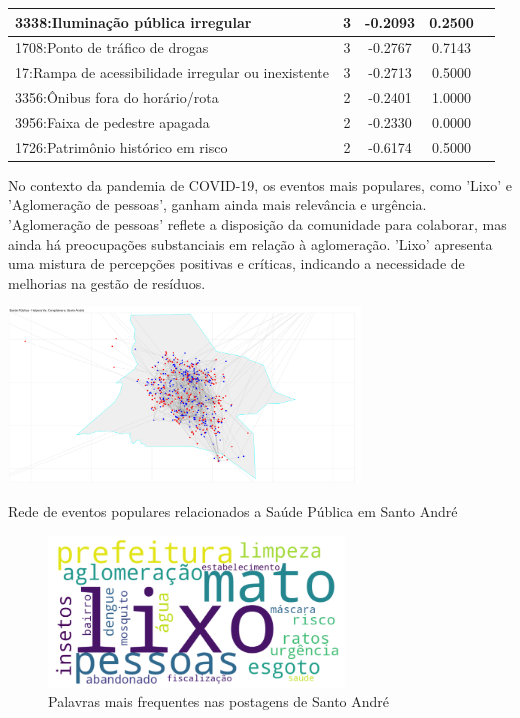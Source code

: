 \begin{table}[htbp]
\begin{tabular}{|l|c|c|c|c|}
		\hline
		3338:Iluminação pública irregular                     & 3                & -0.2093        & 0.2500           \\
		\hline
		1708:Ponto de tráfico de drogas                       & 3                & -0.2767        & 0.7143           \\
		\hline
		17:Rampa de acessibilidade irregular ou inexistente   & 3                & -0.2713        & 0.5000           \\
		\hline
		3356:Ônibus fora do horário/rota                      & 2                & -0.2401        & 1.0000           \\
		\hline
		3956:Faixa de pedestre apagada                        & 2                & -0.2330        & 0.0000           \\
		\hline
		1726:Patrimônio histórico em risco                    & 2                & -0.6174        & 0.5000           \\
		\hline
	\end{tabular}
\end{table}

No contexto da pandemia de COVID-19, os eventos mais populares, como 'Lixo' e 'Aglomeração de pessoas', ganham ainda mais relevância e urgência. 'Aglomeração de pessoas' reflete a disposição da comunidade para colaborar, mas ainda há preocupações substanciais em relação à aglomeração. 'Lixo' apresenta uma mistura de percepções positivas e críticas, indicando a necessidade de melhorias na gestão de resíduos.

\begin{quadro}[htb]
	\centering
	\includegraphics[width=0.7\textwidth]{images/network_santo_andre_personas_map.png}
	\caption{Rede de eventos populares relacionados a Saúde Pública em Santo André}
	\label{fig:network_santo_andre_personas_map}
\end{quadro}

\begin{figure}[htb]
	\centering
	\includegraphics[width=0.7\textwidth]{images/wordcloud_santo_andre.png}
	\caption{Palavras mais frequentes nas postagens de Santo André}
	\label{fig:wordcloud_santo_andre}
\end{figure}

